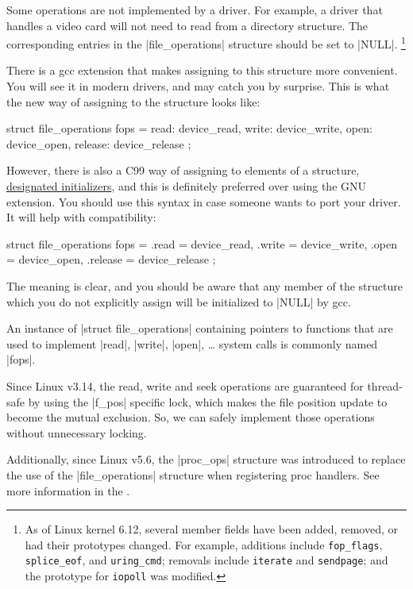 \documentclass[10pt, oneside]{book}
\begin{document}
Some operations are not implemented by a driver.
For example, a driver that handles a video card will not need to read from a directory structure.
The corresponding entries in the \cpp|file_operations| structure should be set to \cpp|NULL|.
\footnote{
As of Linux kernel 6.12, several member fields have been added, removed, or had their prototypes changed.
For example, additions include \texttt{fop\_flags}, \texttt{splice\_eof}, and \texttt{uring\_cmd};
removals include \texttt{iterate} and \texttt{sendpage}; and the prototype for \texttt{iopoll} was modified.
}

There is a gcc extension that makes assigning to this structure more convenient.
You will see it in modern drivers, and may catch you by surprise.
This is what the new way of assigning to the structure looks like:

\begin{code}
struct file_operations fops = {
	read: device_read,
	write: device_write,
	open: device_open,
	release: device_release
};
\end{code}

However, there is also a C99 way of assigning to elements of a structure, \href{https://gcc.gnu.org/onlinedocs/gcc/Designated-Inits.html}{designated initializers}, and this is definitely preferred over using the GNU extension.
You should use this syntax in case someone wants to port your driver.
It will help with compatibility:

\begin{code}
struct file_operations fops = {
	.read = device_read,
	.write = device_write,
	.open = device_open,
	.release = device_release
};
\end{code}

The meaning is clear, and you should be aware that any member of the structure which you do not explicitly assign will be initialized to \cpp|NULL| by gcc.

An instance of \cpp|struct file_operations| containing pointers to functions that are used to implement \cpp|read|, \cpp|write|, \cpp|open|, \ldots{} system calls is commonly named \cpp|fops|.

Since Linux v3.14, the read, write and seek operations are guaranteed for thread-safe by using the \cpp|f_pos| specific lock, which makes the file position update to become the mutual exclusion.
So, we can safely implement those operations without unnecessary locking.

Additionally, since Linux v5.6, the \cpp|proc_ops| structure was introduced to replace the use of the \cpp|file_operations| structure when registering proc handlers.
See more information in the .
\end{document}
